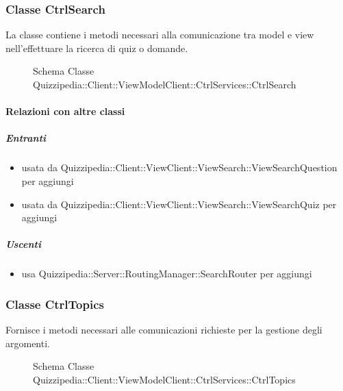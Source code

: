 \subsubsection{Classe CtrlSearch}
La classe contiene i metodi necessari alla comunicazione tra model e view nell'effettuare la ricerca di quiz o domande.
\begin{figure}[H]
\centering
\noindent{}
\caption[Schema Classe CtrlSearch]{Schema Classe Quizzipedia::Client::ViewModelClient::CtrlServices::CtrlSearch}
\end{figure}
\paragraph{Relazioni con altre classi}
\subparagraph{Entranti}
\begin{itemize}
\item usata da Quizzipedia::Client::ViewClient::ViewSearch::ViewSearchQuestion per aggiungi
\item usata da Quizzipedia::Client::ViewClient::ViewSearch::ViewSearchQuiz per aggiungi
\end{itemize}
\subparagraph{Uscenti}
\begin{itemize}
\item usa Quizzipedia::Server::RoutingManager::SearchRouter per aggiungi
\end{itemize}
\subsubsection{Classe CtrlTopics}
Fornisce i metodi necessari alle comunicazioni richieste per la gestione degli argomenti.
\begin{figure}[H]
\centering
\noindent{}
\caption[Schema Classe CtrlTopics]{Schema Classe Quizzipedia::Client::ViewModelClient::CtrlServices::CtrlTopics}
\end{figure}
